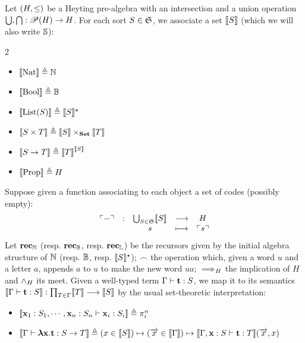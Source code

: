 \documentclass[a4paper,UKenglish,cleveref, autoref, thm-restate]{lipics-v2021}
\begin{document}
\begin{definition}[Semantics]\label{def:sem}
  Let $(H,\leq)$ be a Heyting pre-algebra with an intersection and a union operation $\bigcup,\bigcap : \mathscr{P} (H) \to H$.
  For each sort $S \in \mathfrak S$, we associate a set $\llbracket S \rrbracket$ (which we will also write $\mathbb S$):
  \begin{multicols}{2}
  \begin{itemize}
  \item $\llbracket \mathrm{Nat} \rrbracket \triangleq \mathbb N$
  \item $\llbracket \mathrm{Bool} \rrbracket \triangleq \mathbb B$
  \item $\llbracket \mathrm{List}(S) \rrbracket \triangleq \llbracket S \rrbracket ^\star$
  \item $\llbracket S \times T \rrbracket \triangleq \llbracket S \rrbracket \times_{\mathbf{Set}} \llbracket T \rrbracket$
  \item $\llbracket S \to T \rrbracket \triangleq {\llbracket T \rrbracket}^{\llbracket S \rrbracket}$
  \item $\llbracket \mathrm{Prop} \rrbracket \triangleq H$
  \end{itemize}
  \end{multicols}
  \noindent Suppose given a function associating to each object a set of codes (possibly empty):
  \[\begin{array}{ccccc}
  \ulcorner-\urcorner &:& \bigcup_{S \in \mathfrak S} \llbracket S \rrbracket & \longrightarrow & H \\
  & & s &\longmapsto & \ulcorner s\urcorner
  \end{array}\]
  Let $\textbf{rec}_{\mathbb N}$ (resp. $\textbf{rec}_{\mathbb B}$, resp. $\textbf{rec}_{\mathbb L}$) be the recursors given by the initial algebra structure of $\mathbb N$ (resp. $\mathbb B$, resp. $\llbracket S \rrbracket^\star$); $\smallfrown$ the operation which, given a word $u$ and a letter $a$, appends $a$ to $u$ to make the new word $ua$; $\implies\!\!\!_H$ the implication of $H$ and $\land_H$ its meet.
  Given a well-typed term $\Gamma \vdash \mathbf{t} : S$, we map it to its semantics
  $ \llbracket \Gamma \vdash \mathbf{t} : S \rrbracket : \prod_{T \in \Gamma} \llbracket T \rrbracket \longrightarrow \llbracket S \rrbracket$
  by the usual set-theoretic interpretation:






  \begin{itemize}
  \item $\llbracket \mathbf{x}_1 : S_1,\cdots , \mathbf{x}_n : S_n\vdash \mathbf{x}_i : S_i \rrbracket \triangleq \pi_i^n$
  \item $\llbracket \Gamma \vdash \boldsymbol{\lambda} \mathbf{x}.\mathbf{t} : S \to T \rrbracket \triangleq (x \in \llbracket S \rrbracket) \mapsto (\overrightarrow{x} \in \llbracket \Gamma \rrbracket) \mapsto \llbracket \Gamma, \mathbf{x} : S\vdash \mathbf{t} : T \rrbracket(\overrightarrow{x},x)$
  


\end{itemize}
\end{definition}
\end{document}
